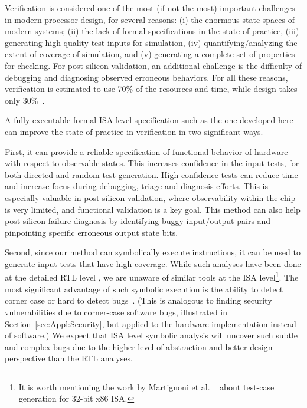 Verification is considered one of the most (if not the most) important 
challenges in modern processor design, for several reasons: 
(i) the enormous state spaces of modern systems; 
(ii) the lack of formal specifications in the state-of-practice, 
(iii) generating high quality test inputs for simulation, 
(iv) quantifying/analyzing the extent of coverage of simulation, and 
(v) generating a complete set of properties for checking. 
For post-silicon validation, an additional challenge is the difficulty 
of debugging and diagnosing observed erroneous behaviors. 
For all these reasons, verification is estimated to use 70\% of the 
resources and time, while design takes only 30\%~\cite{Foster:DAC2015}.

A fully executable formal ISA-level specification such as the one developed here can improve the state of practice in verification in two significant ways. 

First, it can provide a reliable specification of functional behavior of 
hardware with respect to observable states. This increases 
confidence in the input tests, for both directed and random test generation. 
High confidence tests can reduce time and increase focus during debugging, 
triage and diagnosis efforts. This is especially valuable in post-silicon 
validation, where observability within the chip is very limited, and functional 
validation is a key goal. This method can also help post-silicon failure 
diagnosis by identifying buggy input/output pairs and pinpointing specific 
erroneous output state bits.

Second, since our method can symbolically execute instructions, it can be used 
to generate input tests that have high coverage. While such analyses have been 
done at the detailed RTL level \cite{liu2014, liu2011, mishra18}, we are 
unaware of similar tools at the \ISA ISA level\footnote{It is worth mentioning the work by Martignoni et al. ~\cite{Martignoni:ASPLOS2012} about test-case generation for $32$-bit x86 ISA.}. The most significant advantage of 
such symbolic execution is the ability to detect corner case or hard to detect 
bugs~\cite{liu2014,Fonseca:Eurosys2017}.  (This is analogous to finding security vulnerabilities 
due to corner-case software bugs, illustrated in 
Section~\ref{sec:Appl:Security}, but applied to the hardware implementation instead of software.)  We expect that ISA level symbolic analysis will 
uncover such subtle and complex bugs due to the higher level of abstraction 
and better design perspective than the RTL analyses.


